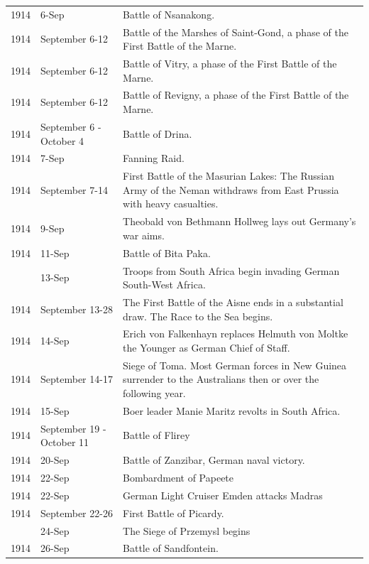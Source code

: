 \documentclass[
  openany]{book}
\begin{document}
\begin{longtable}[t]{rl>{\raggedright\arraybackslash}p{22em}}
\rowcolor{gray!6}  1914 & 6-Sep & Battle of Nsanakong.\\
1914 & September 6-12 & Battle of the Marshes of Saint-Gond, a phase of the First Battle of the Marne.\\
\rowcolor{gray!6}  1914 & September 6-12 & Battle of Vitry, a phase of the First Battle of the Marne.\\
1914 & September 6-12 & Battle of Revigny, a phase of the First Battle of the Marne.\\
\addlinespace
\rowcolor{gray!6}  1914 & September 6 - October 4 & Battle of Drina.\\
1914 & 7-Sep & Fanning Raid.\\
\rowcolor{gray!6}  1914 & September 7-14 & First Battle of the Masurian Lakes: The Russian Army of the Neman withdraws from East Prussia with heavy casualties.\\
1914 & 9-Sep & Theobald von Bethmann Hollweg lays out Germany's war aims.\\
\rowcolor{gray!6}  1914 & 11-Sep & Battle of Bita Paka.\\
\addlinespace
1914 & 13-Sep & Troops from South Africa begin invading German South-West Africa.\\
\rowcolor{gray!6}  1914 & September 13-28 & The First Battle of the Aisne ends in a substantial draw. The Race to the Sea begins.\\
1914 & 14-Sep & Erich von Falkenhayn replaces Helmuth von Moltke the Younger as German Chief of Staff.\\
\rowcolor{gray!6}  1914 & September 14-17 & Siege of Toma. Most German forces in New Guinea surrender to the Australians then or over the following year.\\
1914 & 15-Sep & Boer leader Manie Maritz revolts in South Africa.\\
\addlinespace
\rowcolor{gray!6}  1914 & September 19 - October 11 & Battle of Flirey\\
1914 & 20-Sep & Battle of Zanzibar, German naval victory.\\
\rowcolor{gray!6}  1914 & 22-Sep & Bombardment of Papeete\\
1914 & 22-Sep & German Light Cruiser Emden attacks Madras\\
\rowcolor{gray!6}  1914 & September 22-26 & First Battle of Picardy.\\
\addlinespace
1914 & 24-Sep & The Siege of Przemysl begins\\
\rowcolor{gray!6}  1914 & 26-Sep & Battle of Sandfontein.\\

\end{longtable}
\end{document}
